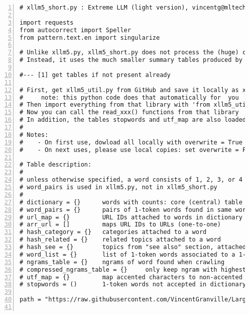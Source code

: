 \documentclass[oneside,10pt]{book}
\begin{document}
\begin{comment}
#querry = "empirical distribution" "berry" ## "Entropy" # "Convolution" # "Spectral analysis" # "time series" # "Autocorrelation" ### "Maximum"  # "Outlier" # "Extreme"  #  "Range"  ### "Markov"   ### "Beta"
######### add categories: Applied Mathematics / Calculus and Analysis / Discrete Mathematics
\end{comment}

\begin{lstlisting}[numbers=left]
# xllm5_short.py : Extreme LLM (light version), vincentg@mltechniques.com

import requests
from autocorrect import Speller
from pattern.text.en import singularize

# Unlike xllm5.py, xllm5_short.py does not process the (huge) crawled data.
# Instead, it uses the much smaller summary tables produced by xllm5.py

#--- [1] get tables if not present already

# First, get xllm5_util.py from GitHub and save it locally as xllm5_util.py
#     note: this python code does that automatically for  you
# Then import everything from that library with 'from xllm5_util import *'
# Now you can call the read_xxx() functions from that library
# In addition, the tables stopwords and utf_map are also loaded
#
# Notes:
#    - On first use, dowload all locally with overwrite = True
#    - On next uses, please use local copies: set overwrite = False 

# Table description: 
#
# unless otherwise specified, a word consists of 1, 2, 3, or 4 tokens
# word_pairs is used in xllm5.py, not in xllm5_short.py
#
# dictionary = {}      words with counts: core (central) table
# word_pairs = {}      pairs of 1-token words found in same word, with count
# url_map = {}         URL IDs attached to words in dictionary
# arr_url = []         maps URL IDs to URLs (one-to-one)
# hash_category = {}   categories attached to a word
# hash_related = {}    related topics attached to a word
# hash_see = {}        topics from "see also" section, attached to word
# word_list = {}       list of 1-token words associated to a 1-token word 
# ngrams_table = {}    ngrams of word found when crawling
# compressed_ngrams_table = {}     only keep ngram with highest count
# utf_map = {}         map accented characters to non-accented version
# stopwords = ()       1-token words not accepted in dictionary

path = "https://raw.githubusercontent.com/VincentGranville/Large-Language-Models/main/llm5/"


\end{lstlisting}
\end{document}
